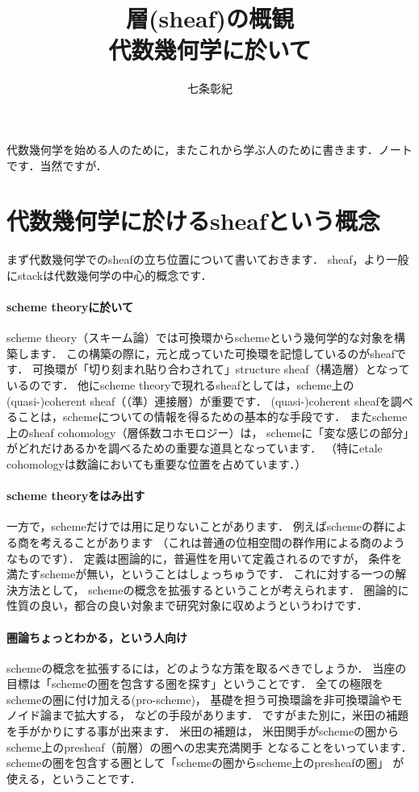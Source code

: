 \documentclass[]{jsarticle}
\begin{document}
    \title{層(sheaf)の概観 \\ {\normalsize 代数幾何学に於いて}}
    \author{七条彰紀}
    \maketitle

    代数幾何学を始める人のために，またこれから学ぶ人のために書きます．ノートです．当然ですが．

    \section{代数幾何学に於けるsheafという概念}
    まず代数幾何学でのsheafの立ち位置について書いておきます．
    sheaf，より一般にstackは代数幾何学の中心的概念です．

    \paragraph{scheme theoryに於いて}
    scheme theory（スキーム論）では可換環からschemeという幾何学的な対象を構築します．
    この構築の際に，元と成っていた可換環を記憶しているのがsheafです．
    可換環が「切り刻まれ貼り合わされて」structure sheaf（構造層）となっているのです．
    他にscheme theoryで現れるsheafとしては，scheme上の(quasi-)coherent sheaf（（準）連接層）が重要です．
    (quasi-)coherent sheafを調べることは，schemeについての情報を得るための基本的な手段です．
    またscheme上のsheaf cohomology（層係数コホモロジー）は，
    schemeに「変な感じの部分」がどれだけあるかを調べるための重要な道具となっています．
    （特にetale cohomologyは数論においても重要な位置を占めています．）

    \paragraph{scheme theoryをはみ出す}
    一方で，schemeだけでは用に足りないことがあります．
    例えばschemeの群による商を考えることがあります
    （これは普通の位相空間の群作用による商のようなものです）．
    定義は圏論的に，普遍性を用いて定義されるのですが，
    条件を満たすschemeが無い，ということはしょっちゅうです．
    これに対する一つの解決方法として，
    schemeの概念を拡張するということが考えられます．
    圏論的に性質の良い，都合の良い対象まで研究対象に収めようというわけです．

    \paragraph{圏論ちょっとわかる，という人向け}
    schemeの概念を拡張するには，どのような方策を取るべきでしょうか．
    当座の目標は「schemeの圏を包含する圏を探す」ということです．
    全ての極限をschemeの圏に付け加える(pro-scheme)，
    基礎を担う可換環論を非可換環論やモノイド論まで拡大する，
    などの手段があります．
    ですがまた別に，米田の補題を手がかりにする事が出来ます．
    米田の補題は，
    米田関手がschemeの圏からscheme上のpresheaf（前層）の圏への忠実充満関手
    となることをいっています．
    schemeの圏を包含する圏として「schemeの圏からscheme上のpresheafの圏」
    が使える，ということです．
\end{document}
